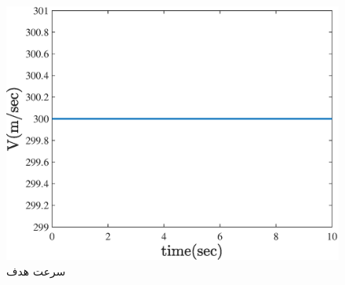 \begin{figure}[H]
	\centering
	\includegraphics[width=.75\linewidth]{../Figure/a/target_V}
	\caption{سرعت هدف}
\end{figure}


